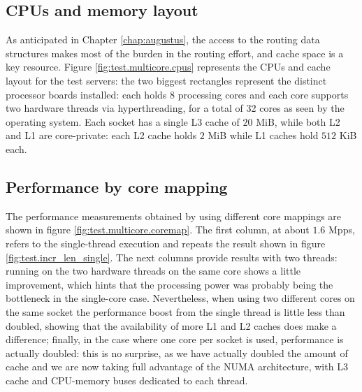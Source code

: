 \documentclass[11pt,a4paper,twoside,titlepage,openany]{book}
\begin{document}
\subsection{CPUs and memory layout}\label{sec:test.multicore.layout}
As anticipated in Chapter \ref{chap:augustus}, the access to the routing data structures makes most of the burden in the routing effort, and cache space is a key resource. Figure \ref{fig:test.multicore.cpus} represents the CPUs and cache layout for the test servers: the two biggest rectangles represent the distinct processor boards installed: each holds $8$ processing cores and each core supports two hardware threads via hyperthreading, for a total of 32 cores as seen by the operating system.
Each socket has a single L3 cache of $20$ MiB, while both L2 and L1 are core-private: each L2 cache holds $2$ MiB while L1 caches hold $512$ KiB each.

\subsection{Performance by core mapping}\label{sec:test.multicore.performance}

The performance measurements obtained by using different core mappings are shown in figure \ref{fig:test.multicore.coremap}. The first column, at about $1.6$ Mpps, refers to the single-thread execution and repeats the result shown in figure \ref{fig:test.incr_len_single}. The next columns provide results with two threads: running on the two hardware threads on the same core shows a little improvement, which hints that the processing power was probably being the bottleneck in the single-core case. Nevertheless, when using two different cores on the same socket the performance boost from the single thread is little less than doubled, showing that the availability of more L1 and L2 caches does make a difference; finally, in the case where one core per socket is used, performance is actually doubled: this is no surprise, as we have actually doubled the amount of cache and we are now taking full advantage of the NUMA architecture, with L3 cache and CPU-memory buses dedicated to each thread.
\end{document}
